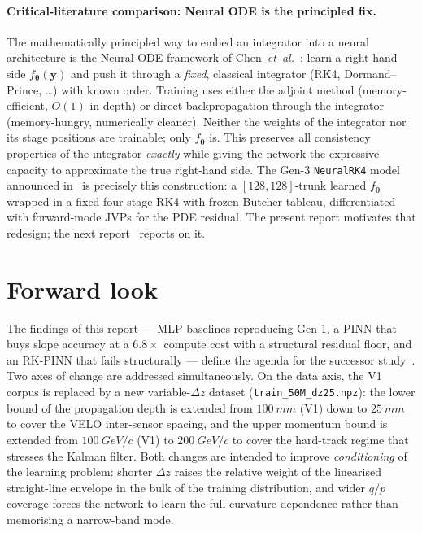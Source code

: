 \documentclass[a4paper,11pt]{article}
\newcommand{\SI}[2]{#1~#2}
\newcommand{\qop}{q/p}
\newcommand{\dz}{\Delta z}
\newcommand{\state}{\mathbf{y}}
\newcommand{\btheta}{\bm{\theta}}
\begin{document}
\paragraph{Critical-literature comparison: Neural ODE is the principled fix.}
The mathematically principled way to embed an integrator into a neural
architecture is the Neural ODE framework of
Chen~\textit{et~al.}~\cite{chen2018neuralode}: learn a right-hand side
$f_{\btheta}(\state)$ and push it through a \emph{fixed}, classical
integrator (RK4, Dormand--Prince, \ldots) with known order. Training uses
either the adjoint method (memory-efficient, $O(1)$ in depth) or direct
backpropagation through the integrator (memory-hungry, numerically
cleaner). Neither the weights of the integrator nor its stage positions
are trainable; only $f_{\btheta}$ is. This preserves all consistency
properties of the integrator \emph{exactly} while giving the network the
expressive capacity to approximate the true right-hand side. The Gen-3
\texttt{NeuralRK4} model announced in~\cite{gen2newreport} is precisely
this construction: a $[128,128]$-trunk learned $f_{\btheta}$ wrapped in a
fixed four-stage RK4 with frozen Butcher tableau, differentiated with
forward-mode JVPs for the PDE residual. The present report motivates
that redesign; the next report~\cite{gen2newreport} reports on it.

\section{Forward look}\label{gen2old:sec:forward}

The findings of this report --- MLP baselines reproducing Gen-1, a PINN
that buys slope accuracy at a $6.8\times$ compute cost with a structural
residual floor, and an RK-PINN that fails structurally --- define the
agenda for the successor study~\cite{gen2newreport}. Two axes of change
are addressed simultaneously. On the data axis, the V1 corpus is replaced by a new variable-$\dz$
dataset (\texttt{train\_50M\_dz25.npz}): the lower bound of the propagation
depth is extended from $\SI{100}{mm}$ (V1) down to $\SI{25}{mm}$ to cover
the VELO inter-sensor spacing, and the upper momentum bound is extended from
$\SI{100}{GeV/c}$ (V1) to $\SI{200}{GeV/c}$ to cover the hard-track regime
that stresses the Kalman filter. Both changes are intended to improve
\emph{conditioning} of the learning problem: shorter $\dz$ raises the
relative weight of the linearised straight-line envelope in the bulk of the
training distribution, and wider $\qop$ coverage forces the network to
learn the full curvature dependence rather than memorising a narrow-band
mode.
\end{document}
